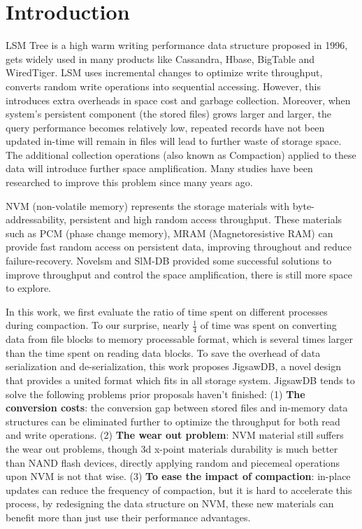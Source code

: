 \section{Introduction}

LSM Tree is a high warm writing performance data structure proposed in 1996\cite{o1996log}, gets widely used in many products like  Cassandra\cite{ApacheCa22:online}, Hbase\cite{ApacheHB26:online}, BigTable\cite{chang2008bigtable} and WiredTiger\cite{WiredTig38:online}. LSM uses incremental changes to optimize write throughput, converts random write operations into sequential accessing. However, this introduces extra overheads in space cost and garbage collection. Moreover, when system's persistent component (the stored files) grows larger and larger, the query performance becomes relatively low, repeated records have not been updated in-time will remain in files will lead to further waste of storage space. The additional collection operations (also known as Compaction) applied to these data will introduce further space amplification. Many studies have been researched to improve this problem\cite{dayan2017monkey,dayan2018dostoevsky,kaiyrakhmet2019slm,kannan2018redesigning,raju2017pebblesdb,wu2015lsm,sears2012blsm} since many years ago.

NVM (non-volatile memory) represents the storage materials with byte-addressability, persistent and high random access throughput. These materials such as PCM (phase change memory), MRAM (Magnetoresistive RAM) can provide fast random access on persistent data, improving throughout and reduce failure-recovery. Novelsm\cite{kannan2018redesigning} and SlM-DB\cite{kaiyrakhmet2019slm} provided some successful solutions to improve throughput and control the space amplification, there is still more space to explore.

In this work, we first evaluate the ratio of time spent on different processes during compaction. To our surprise, nearly $\frac{1}{4}$ of time was spent on converting data from file blocks to memory processable format, which is several times larger than the time spent on reading data blocks. To save the overhead of data serialization and de-serialization, this work proposes JigsawDB, a novel design that provides a united format which fits in all storage system. JigsawDB tends to solve the following problems prior proposals haven't finished: (1) \textbf{The conversion costs}: the conversion gap between stored files and in-memory data structures can be eliminated further to optimize the throughput for both read and write operations. (2) \textbf{The wear out problem}: NVM material still suffers the wear out problems, though 3d x-point materials durability is much better than NAND flash devices, directly applying random and piecemeal operations upon NVM is not that wise. (3) \textbf{To ease the impact of compaction}: in-place updates can reduce the frequency of compaction, but it is hard to accelerate this process, by redesigning the data structure on NVM, these new materials can benefit more than just use their performance advantages.

